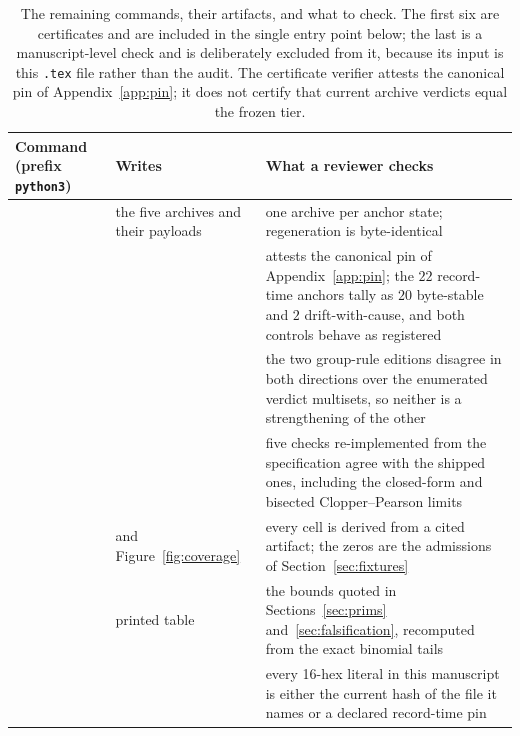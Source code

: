\documentclass{article}
\begin{document}
\begin{table}[htbp]
\caption{The remaining commands, their artifacts, and what to check. The first six are
certificates and are included in the single entry point below; the last is a
manuscript-level check and is deliberately excluded from it, because its input is this
\texttt{.tex} file rather than the audit. The certificate verifier attests the canonical
pin of Appendix~\ref{app:pin}; it does not certify that current archive verdicts equal the
frozen tier.}
\label{tab:repro}
\centering
\scriptsize
\setlength{\tabcolsep}{4pt}
\begin{tabular}{@{}L{128pt} L{104pt} L{149pt}@{}}
\toprule
Command (prefix \texttt{python3}) & Writes & What a reviewer checks \\
\midrule
{} & the five  archives and their
  payloads & one archive per anchor state; regeneration is byte-identical \\
\addlinespace[2pt]
 & 
  & attests the canonical pin of Appendix~\ref{app:pin}; the $22$ record-time anchors tally
    as $20$ byte-stable and $2$ drift-with-cause, and both controls behave as registered \\
\addlinespace[2pt]
 & 
  & the two group-rule editions disagree in both directions over the enumerated verdict
    multisets, so neither is a strengthening of the other \\
\addlinespace[2pt]
 & 
  & five checks re-implemented from the specification agree with the shipped ones, including
    the closed-form and bisected Clopper--Pearson limits \\
\addlinespace[2pt]
 &  and
  Figure~\ref{fig:coverage} & every cell is derived from a cited artifact; the zeros are the
  admissions of Section~\ref{sec:fixtures} \\
\addlinespace[2pt]
 & printed table
  & the bounds quoted in Sections~\ref{sec:prims} and~\ref{sec:falsification}, recomputed
    from the exact binomial tails \\
\addlinespace[2pt]
 & 
  & every 16-hex literal in this manuscript is either the current hash of the file it names
    or a declared record-time pin \\
\bottomrule
\end{tabular}
\end{table}
\end{document}
